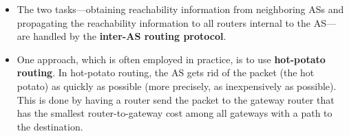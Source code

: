 \begin{itemize}
\item
The two tasks---obtaining reachability information from neighboring ASs and propagating the reachability information to all routers internal to the AS---are handled by the \textbf{inter-AS routing protocol}.

\item
One approach, which is often employed in practice, is to use \textbf{hot-potato routing}. In hot-potato routing, the AS gets rid of the packet (the hot potato) as quickly as possible (more precisely, as inexpensively as possible). This is done by having a router send the packet to the gateway router that has the smallest router-to-gateway cost among all gateways with a path to the destination.




















\end{itemize}